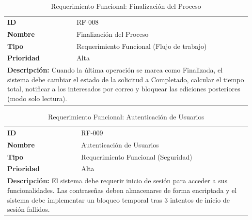 \documentclass[12pt,letterpaper,spanish]{report}
\begin{document}
\begin{table}[H]
    \centering
    \caption{Requerimiento Funcional: Finalización del Proceso}
    \label{tab:rf008}
    \begin{tabular}{ll}
        \toprule
        \textbf{ID} & RF-008 \\
        \textbf{Nombre} & Finalización del Proceso \\
        \textbf{Tipo} & Requerimiento Funcional (Flujo de trabajo) \\
        \textbf{Prioridad} & Alta \\
        \midrule
        \multicolumn{2}{l}{
            \parbox{0.9\linewidth}{
                \textbf{Descripción:} Cuando la última operación se marca como Finalizada, el sistema debe cambiar el estado de la solicitud a Completado, calcular el tiempo total, notificar a los interesados por correo y bloquear las ediciones posteriores (modo solo lectura).
            }
        } \\
        \bottomrule
    \end{tabular}
\end{table}

\begin{table}[H]
    \centering
    \caption{Requerimiento Funcional: Autenticación de Usuarios}
    \label{tab:rf009}
    \begin{tabular}{ll}
        \toprule
        \textbf{ID} & RF-009 \\
        \textbf{Nombre} & Autenticación de Usuarios \\
        \textbf{Tipo} & Requerimiento Funcional (Seguridad) \\
        \textbf{Prioridad} & Alta \\
        \midrule
        \multicolumn{2}{l}{
            \parbox{0.9\linewidth}{
                \textbf{Descripción:} El sistema debe requerir inicio de sesión para acceder a sus funcionalidades. Las contraseñas deben almacenarse de forma encriptada y el sistema debe implementar un bloqueo temporal tras 3 intentos de inicio de sesión fallidos.
            }
        } \\
        \bottomrule
    \end{tabular}
\end{table}
\end{document}
